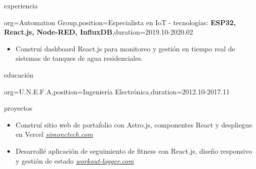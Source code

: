 \documentclass{resume}
\begin{document}
\begin{ResumeSection}{experiencia}
\begin{ResumeSubsection}
\begin{itemize}
        \end{itemize}
    \end{ResumeSubsection}
    \begin{ResumeSubsection}{org={Automation Group},position={Especialista en IoT - tecnologías: \textbf{ESP32, React.js, Node-RED, InfluxDB}},duration={2019.10-2020.02}}
        \begin{itemize}
            \item Construí dashboard React.js para monitoreo y gestión en tiempo real de sistemas de tanques de agua residenciales.
        \end{itemize}
    \end{ResumeSubsection}
\end{ResumeSection}

\begin{ResumeSection}{educación}
    \begin{ResumeSubsection}{org={U.N.E.F.A},position={Ingeniería Electrónica},duration={2012.10-2017.11}}
    \end{ResumeSubsection}
\end{ResumeSection}

\begin{ResumeSection}{proyectos}
    \begin{itemize}
        \item Construí sitio web de portafolio con Astro.js, componentes React y despliegue en Vercel \hfill\em{{\href{https://www.simonctech.com}{simonctech.com}}}
    \end{itemize}
    \begin{itemize}
        \item Desarrollé aplicación de seguimiento de fitness con React.js, diseño responsivo y gestión de estado \hfill\em{{\href{https://workout-logger-sable.vercel.app/}{workout-logger.com}}}
    \end{itemize}
\end{ResumeSection}
\end{document}
